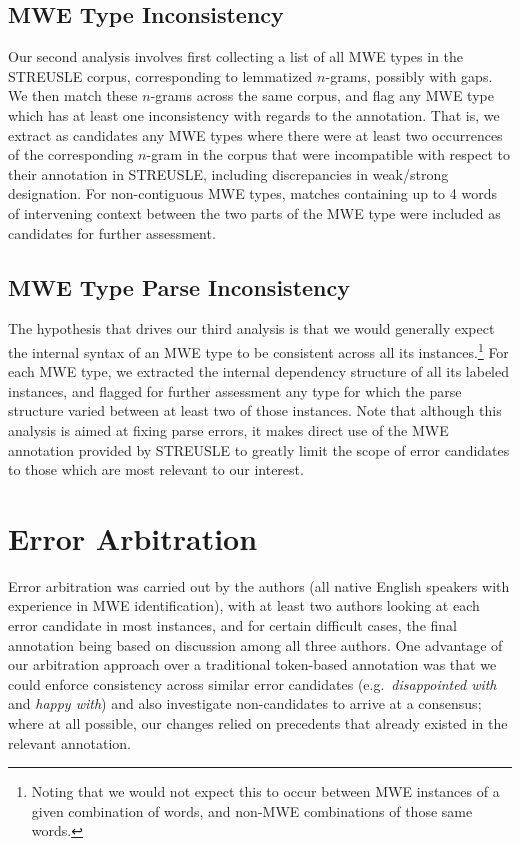 \documentclass[output=paper
,modfonts
,nonflat]{langsci/langscibook}
\newcommand{\lex}[1]{\textit{#1}\xspace}
\newcommand{\ngram}[1][]{$n$-gram{#1}\xspace}
\begin{document}
\subsection{MWE Type Inconsistency}

Our second analysis involves first collecting a list of all MWE types in the STREUSLE corpus, corresponding to lemmatized \ngram[s], possibly with gaps. We then match these \ngram[s] across the same corpus, and flag any MWE type which has at least one inconsistency with regards to the annotation. That is, we extract as candidates any MWE types where there were at least two occurrences of the corresponding \ngram in the corpus that were incompatible with respect to their annotation in STREUSLE, including discrepancies in weak/strong designation. For non-contiguous MWE types, matches containing up to 4 words of intervening context between the two parts of the MWE type were included as candidates for further assessment.

\subsection{MWE Type Parse Inconsistency}

The hypothesis that drives our third analysis is that we would generally expect the internal syntax of an MWE type to be consistent across all its instances.\footnote{Noting that we would not expect this to occur between MWE instances of a given combination of words, and non-MWE combinations of those same words.}  For each MWE type, we extracted the internal dependency structure of all its labeled instances, and flagged for further assessment any type for which the parse structure varied between at least two of those instances. Note that although this analysis is aimed at fixing parse errors, it makes direct use of the MWE annotation provided by STREUSLE to greatly limit the scope of error candidates to those which are most relevant to our interest.


\section{Error Arbitration}

Error arbitration was carried out by the authors (all native English speakers with experience in MWE identification), with at least two authors looking at each error candidate in most instances, and for certain difficult cases, the final annotation being based on discussion among all three authors. One advantage of our arbitration approach over a traditional token-based annotation was that we could enforce consistency across similar error candidates (e.g.\ \lex{disappointed with} and \lex{happy with}) and also investigate non-candidates to arrive at a consensus; where at all possible, our changes relied on precedents that already existed in the relevant annotation. 
\end{document}
